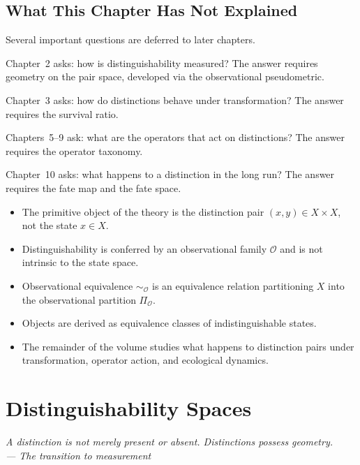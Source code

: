 \documentclass[12pt,twoside,openright]{book}
\newcommand{\obs}{\mathcal{O}}
\newenvironment{epigraph}[2]{%
  \vspace{1em}\begin{flushright}
  \begin{minipage}{0.72\textwidth}
  \itshape\small #1\\[0.4em]
  \upshape\footnotesize\sffamily\color{DistGray}--- #2
  \end{minipage}\end{flushright}\vspace{1.5em}}{}
\newenvironment{chapsummary}{%
  \begin{tcolorbox}[colback=DistBlue!5,colframe=DistBlue,
    title={\faBookOpen\enspace Summary},
    fonttitle=\sffamily\bfseries\color{white},
    attach boxed title to top left={yshift=-2mm,xshift=4mm},
    boxed title style={colback=DistBlue,rounded corners}]
  \begin{itemize}[nosep,leftmargin=*]}{%
  \end{itemize}\end{tcolorbox}}
\providecommand{\partitionObs}{\Pi_{\obs}}
\begin{document}
\section{What This Chapter Has Not Explained}

Several important questions are deferred to later chapters.

Chapter~2 asks: how is distinguishability measured? The answer
requires geometry on the pair space, developed via the
observational pseudometric.

Chapter~3 asks: how do distinctions behave under transformation?
The answer requires the survival ratio.

Chapters~5--9 ask: what are the operators that act on
distinctions? The answer requires the operator taxonomy.

Chapter~10 asks: what happens to a distinction in the long run?
The answer requires the fate map and the fate space.

\begin{chapsummary}
\item The primitive object of the theory is the distinction
  pair $(x,y)\in X\times X$, not the state $x\in X$.
\item Distinguishability is conferred by an observational
  family $\obs$ and is not intrinsic to the state space.
\item Observational equivalence $\sim_\obs$ is an equivalence
  relation partitioning $X$ into the observational partition
  $\partitionObs$.
\item Objects are derived as equivalence classes of
  indistinguishable states.
\item The remainder of the volume studies what happens to
  distinction pairs under transformation, operator action,
  and ecological dynamics.
\end{chapsummary}


\chapter{Distinguishability Spaces}
\label{ch:dist-spaces}

\begin{epigraph}{A distinction is not merely present or absent.
  Distinctions possess geometry.}{The transition to measurement}
\end{epigraph}
\end{document}
